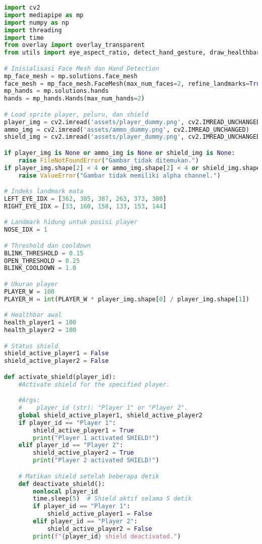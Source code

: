 \documentclass[11pt,a4paper]{article}
\begin{document}
\begin{lstlisting}[language=Python, caption=Main.py]
import cv2
import mediapipe as mp
import numpy as np
import threading
import time
from overlay import overlay_transparent
from utils import eye_aspect_ratio, detect_hand_gesture, draw_healthbar

# Inisialisasi Face Mesh dan Hand Detection
mp_face_mesh = mp.solutions.face_mesh
face_mesh = mp_face_mesh.FaceMesh(max_num_faces=2, refine_landmarks=True)
mp_hands = mp.solutions.hands
hands = mp_hands.Hands(max_num_hands=2)

# Load sprite player, peluru, dan shield
player_img = cv2.imread('assets/player_dummy.png', cv2.IMREAD_UNCHANGED)
ammo_img = cv2.imread('assets/ammo_dummy.png', cv2.IMREAD_UNCHANGED)
shield_img = cv2.imread('assets/player_dummy.png', cv2.IMREAD_UNCHANGED)

if player_img is None or ammo_img is None or shield_img is None:
    raise FileNotFoundError("Gambar tidak ditemukan.")
if player_img.shape[2] < 4 or ammo_img.shape[2] < 4 or shield_img.shape[2] < 4:
    raise ValueError("Gambar tidak memiliki alpha channel.")

# Indeks landmark mata
LEFT_EYE_IDX = [362, 385, 387, 263, 373, 380]
RIGHT_EYE_IDX = [33, 160, 158, 133, 153, 144]

# Landmark hidung untuk posisi player
NOSE_IDX = 1

# Threshold dan cooldown
BLINK_THRESHOLD = 0.15
OPEN_THRESHOLD = 0.25
BLINK_COOLDOWN = 1.0

# Ukuran player
PLAYER_W = 100
PLAYER_H = int(PLAYER_W * player_img.shape[0] / player_img.shape[1])

# Healthbar awal
health_player1 = 100
health_player2 = 100

# Status shield
shield_active_player1 = False
shield_active_player2 = False

def activate_shield(player_id):
    #Activate shield for the specified player.

    #Args:
    #    player_id (str): "Player 1" or "Player 2".
    global shield_active_player1, shield_active_player2
    if player_id == "Player 1":
        shield_active_player1 = True
        print("Player 1 activated SHIELD!")
    elif player_id == "Player 2":
        shield_active_player2 = True
        print("Player 2 activated SHIELD!")

    # Matikan shield setelah beberapa detik
    def deactivate_shield():
        nonlocal player_id
        time.sleep(5)  # Shield aktif selama 5 detik
        if player_id == "Player 1":
            shield_active_player1 = False
        elif player_id == "Player 2":
            shield_active_player2 = False
        print(f"{player_id} shield deactivated.")


\end{lstlisting}
\end{document}
